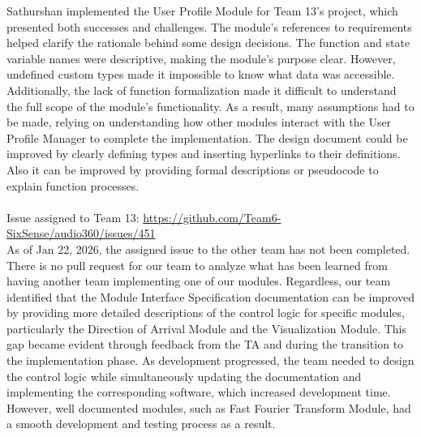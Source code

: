 \documentclass[12pt, titlepage]{article}
\begin{document}
Sathurshan implemented the User Profile Module for Team 13's project, which
presented both successes and challenges. The module's references to requirements
helped clarify the rationale behind some design decisions. The function and
state variable names were descriptive, making the module's purpose clear.
However, undefined custom types made it impossible to know what data was
accessible. Additionally, the lack of function formalization made it difficult
to understand the full scope of the module's functionality. As a result, many
assumptions had to be made, relying on understanding how other modules interact
with the User Profile Manager to complete the implementation. The design
document could be improved by clearly defining types and inserting hyperlinks to
their definitions. Also it can be improved by providing formal descriptions or
pseudocode to explain function processes.
\\\\
Issue assigned to Team 13: 
\url{https://github.com/Team6-SixSense/audio360/issues/451} \\

As of Jan 22, 2026, the assigned issue to the other team has not been completed.
There is no pull request for our team to analyze what has been learned from
having another team implementing one of our modules. Regardless, our team
identified that the Module Interface Specification documentation can be
improved by providing more detailed descriptions of the control logic for
specific modules, particularly the Direction of Arrival Module and the
Visualization Module. This gap became evident through feedback from the TA and
during the transition to the implementation phase. As development progressed,
the team needed to design the control logic while simultaneously updating the
documentation and implementing the corresponding software, which increased
development time. However, well documented modules, such as Fast Fourier
Transform Module, had a smooth development and testing process as a result.
\end{document}
